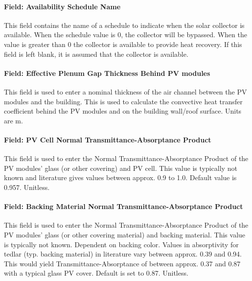 \paragraph{Field: Availability Schedule Name}\label{BIPVT-field-Sched}

This field contains the name of a schedule to indicate when the solar collector is available. When the schedule value is 0, the collector will be bypassed. When the value is greater than 0 the collector is available to provide heat recovery. If this field is left blank, it is assumed that the collector is available.

\paragraph{Field: Effective Plenum Gap Thickness Behind PV modules}\label{BIPVT-field-Gap}

This field is used to enter a nominal thickness of the air channel between the PV modules and the building. This is used to calculate the convective heat transfer coefficient behind the PV modules and on the building wall/roof surface. Units are \si{\m}. 

\paragraph{Field: PV Cell Normal Transmittance-Absorptance Product}\label{BIPVT-field-PVcell-tau-alpha}

This field is used to enter the Normal Transmittance-Absorptance Product of the PV modules' glass (or other covering) and PV cell. This value is typically not known and literature gives values between approx. 0.9 to 1.0. Default value is 0.957. Unitless.

\paragraph{Field: Backing Material Normal Transmittance-Absorptance Product}\label{BIPVT-field-backing-tau-alpha}

This field is used to enter the Normal Transmittance-Absorptance Product of the PV modules' glass (or other covering material) and backing material. This value is typically not known. Dependent on backing color. Values in absorptivity for tedlar (typ. backing material) in literature vary between approx. 0.39 and 0.94. This would yield Transmittance-Absorptance of between approx. 0.37 and 0.87 with a typical glass PV cover. Default is set to 0.87. Unitless.

